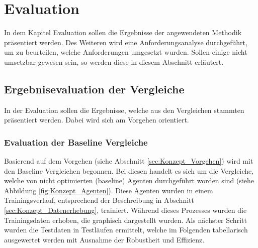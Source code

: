 \chapter{Evaluation} \label{chap:Evaluation}
In dem Kapitel Evaluation sollen die Ergebnisse der angewendeten Methodik präsentiert werden. Des Weiteren wird eine Anforderungsanalyse durchgeführt, um zu beurteilen, welche Anforderungen umgesetzt wurden. Sollen einige nicht umsetzbar gewesen sein, so werden diese in diesem Abschnitt erläutert.

\section{Ergebnisevaluation der Vergleiche} \label{sec:Evaluation_Ergebnisevaluation}
In der Evaluation sollen die Ergebnisse, welche aus den Vergleichen stammten präsentiert werden. Dabei wird sich am Vorgehen orientiert.

\subsection{Evaluation der Baseline Vergleiche}
Basierend auf dem Vorgehen (siehe Abschnitt \ref{sec:Konzept_Vorgehen}) wird mit den Baseline Vergleichen begonnen. Bei diesen handelt es sich um die Vergleiche, welche von  nicht optimierten (baseline) Agenten durchgeführt worden sind (siehe Abbildung \ref{fig:Konzept_Agenten}). Diese Agenten wurden in einem Trainingsverlauf, entsprechend der Beschreibung in Abschnitt \ref{sec:Konzept_Datenerhebung}, trainiert. 
Während dieses Prozesses wurden die Trainingsdaten erhoben, die graphisch dargestellt wurden. 
Als nächster Schritt wurden die Testdaten in Testläufen ermittelt, welche im Folgenden tabellarisch ausgewertet werden mit Ausnahme der Robustheit und Effizienz.

